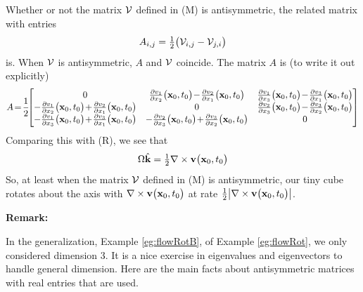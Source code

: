 \begin{eg}\label{eg:flowRotC}

Whether or not the matrix $\mathcal{V}$ defined in (M) is antisymmetric, 
the related matrix with entries
\begin{equation*}
A_{i,j}=\tfrac{1}{2}\big(\mathcal{V}_{i,j}-\mathcal{V}_{j,i}\big)
\end{equation*}
is.  When $\mathcal{V}$ is antisymmetric, $A$ and $\mathcal{V}$ coincide. The matrix $A$
is (to write it out explicitly)
\begin{equation*}
A\!=\!\frac{1}{2}\!\!\left[\begin{matrix}0 & 
                        \frac{\partial v_1}{\partial x_2}\big(\vx_0,t_0\big)
                   \!-\!\frac{\partial v_2}{\partial x_1}\big(\vx_0,t_0\big)&
                        \frac{\partial v_1}{\partial x_3}\big(\vx_0,t_0\big)
                  \!-\!\frac{\partial v_3}{\partial x_1}\big(\vx_0,t_0\big)\cr
                        -\frac{\partial v_1}{\partial x_2}\big(\vx_0,t_0\big)
                   \!+\!\frac{\partial v_2}{\partial x_1}\big(\vx_0,t_0\big)&
                        0 &
                        \frac{\partial v_2}{\partial x_3}\big(\vx_0,t_0\big)
                   \!-\!\frac{\partial v_3}{\partial x_2}\big(\vx_0,t_0\big)\cr
                       -\frac{\partial v_1}{\partial x_3}\big(\vx_0,t_0\big)
                    \!+\!\frac{\partial v_3}{\partial x_1}\big(\vx_0,t_0\big)&
                       -\frac{\partial v_2}{\partial x_3}\big(\vx_0,t_0\big)
                    \!+\!\frac{\partial v_3}{\partial x_2}\big(\vx_0,t_0\big)&
                     0\end{matrix}\right]
\end{equation*}
Comparing this with (R), we see that
\begin{equation*}
\Omega \hat{\mathbf{k}}=\tfrac{1}{2}\nabla\times \mathbf{v}\big(\mathbf{x}_0,t_0\big)
\end{equation*}
So, at least when the matrix $\mathcal{V}$ defined in (M) is antisymmetric, 
our tiny cube rotates about the axis with 
$\nabla\times \mathbf{v}\big(\mathbf{x}_0,t_0\big)$ at rate
$\tfrac{1}{2}\big|\nabla\times \mathbf{v}\big(\mathbf{x}_0,t_0\big)\big|$. 

\end{eg}

\noindent\textbf{Remark:}

\noindent
In the generalization, Example \ref{eg:flowRotB}, of 
Example \ref{eg:flowRot}, we only considered dimension 3. It
is a nice exercise in eigenvalues and eigenvectors to handle general dimension.
Here are the main facts about antisymmetric matrices with real entries
that are used.

